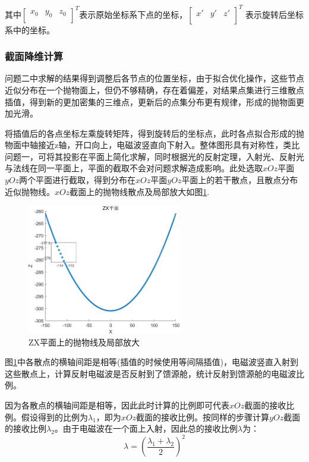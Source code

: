 \documentclass[withoutpreface,bwprint]{cumcmthesis} %
\begin{document}
	其中$
	\left[ \begin{matrix}
	x_0&		y_0&		z_0\\
	\end{matrix} \right] ^T
	$表示原始坐标系下点的坐标，$
	\left[ \begin{matrix}
	x'&		y'&		z'\\
	\end{matrix} \right] ^T
	$ 表示旋转后坐标系中的坐标。
	
	\subsubsection{截面降维计算}
	问题二中求解的结果得到调整后各节点的位置坐标，由于拟合优化操作，这些节点近似分布在一个抛物面上，但仍不够精确，存在着偏差，对结果点集进行三维散点插值，得到新的更加密集的三维点，更新后的点集分布更有规律，形成的抛物面更加光滑。
	
	将插值后的各点坐标左乘旋转矩阵，得到旋转后的坐标点，此时各点拟合形成的抛物面中轴接近z轴，开口向上，电磁波竖直向下射入。整体图形具有对称性，类比问题一，可将其投影在平面上简化求解，同时根据光的反射定理，入射光、反射光与法线在同一平面上，平面的截取不会对问题求解造成影响。此处选取$xOz$平面$yOz$两个平面进行截取，得到分布在$xOz$平面$yOz$平面上的若干散点，且散点分布近似抛物线。$xOz$截面上的抛物线散点及局部放大如图\ref{问题3 ZX平面上的抛物线及局部放大}.
			\begin{figure}[!htp]
		\centering
		\includegraphics[width=0.6\textwidth]{问题3 ZX平面上的抛物线及局部放大}
		\caption{ZX平面上的抛物线及局部放大}
		\label{问题3 ZX平面上的抛物线及局部放大}
	\end{figure}
	图\ref{问题3 ZX平面上的抛物线及局部放大}中各散点的横轴间距是相等(插值的时候使用等间隔插值)，电磁波竖直入射到这些散点上，计算反射电磁波是否反射到了馈源舱，统计反射到馈源舱的电磁波比例。
	
	因为各散点的横轴间距是相等，因此此时计算的比例即可代表$xOz$截面的接收比例。假设得到的比例为$\lambda_1$，即为$xOz$截面的接收比例。按同样的步骤计算$yOz$截面的接收比例$\lambda_2$。由于电磁波在一个面上入射，因此总的接收比例$\lambda$为：
	\begin{equation}\label{lb}
	\lambda =\left( \frac{\lambda _1+\lambda _2}{2} \right) ^2
	\end{equation}
	
\end{document}

